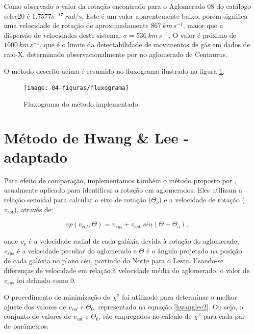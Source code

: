 Como observado o valor da rotação encontrado para o Aglomerado 08 do catálogo selec20 é $1.7577e^{-17}~rad/s$. Este é um valor aparentemente baixo, porém significa uma velocidade de rotação de aproximadamente $867 ~km \, s^{-1}$, maior que a dispersão de velocidades deste sistema,
$\sigma = 536~km \, s^{-1}$. O valor é próximo  de $1000 ~km \, s^{-1}$, que é o limite da detectabilidade de movimentos de gás em dados de raio-X, determinado observacionalmente por  no aglomerado de Centaurus.

O método descrito acima é resumido no fluxograma ilustrado na figura \ref{fluxograma}.

\begin{figure}[H] %
\vspace{-2pt}
\begin{center}
\texttt{[image: 04-figuras/fluxograma]}%
\caption{Fluxograma do método implementado.}
\label{fluxograma}%
\end{center}
\end{figure}

\section{Método de Hwang \& Lee - adaptado}

Para efeito de comparação, implementamos também o 
método proposto por , usualmente aplicado para identificar a rotação em aglomerados. Eles utilizam a relação senoidal para calcular o eixo de rotação ($\Theta_o$) e a velocidade de rotação ($v_{rot}$), através de:

\begin{equation}
 vp(v_{rot}, \Theta) = v_{sys} + v_{rot} . sin(\Theta - \Theta_o) ,
 \label{eq:hwanglee1}
\end{equation}

\noindent onde $v_p$ é a velocidade radial de cada galáxia devida à rotação do aglomerado, $v_{sys}$ é a velocidade peculiar do aglomerado e $\Theta$ é o ângulo projetado na posição de cada galáxia no plano céu, partindo do Norte para o Leste. Usando-se diferenças de velocidade em relação à velocidade média do aglomerado, o valor de $v_{sys}$ foi definido como 0.

O procedimento de minimização do $\chi^2$ foi utilizado para determinar o melhor ajuste dos valores de $v_{rot}$ e $\Theta_0$, representado na equação \ref{hwanglee2}. Ou seja, o conjunto de valores de $v_{rot}$ e $\Theta_0$, são empregados no cálculo de $\chi^2$ para cada par de parâmetros:

